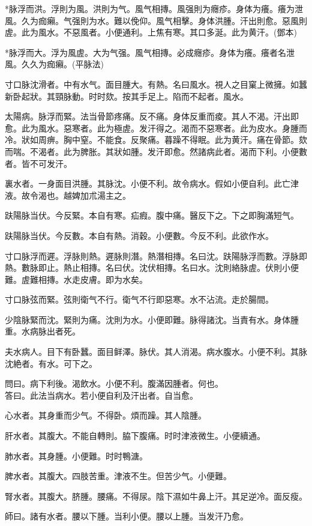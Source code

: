 \documentclass[b5paper,twoside,zihao=-4,UTF8]{ctexbook}
\begin{document}
*脉浮而洪。浮則为風。洪則为气。風气相摶。風强則为癮疹。身体为癢。癢为泄風。久为痂癩。气强則为水。難以俛仰。風气相擊。身体洪腫。汗出則愈。惡風則虗。此为風水。不惡風者。小便通利。上焦有寒。其口多涎。此为黄汗。(鄧本)

*脉浮而大。浮为風虗。大为气强。風气相摶。必成癮疹。身体为癢。癢者名泄風。久久为痂癩。(平脉法)

寸口脉沈滑者。中有水气。面目腫大。有熱。名曰風水。視人之目窠上微擁。如{蠶}新卧起狀。其頸脉動。时时欬。按其手足上。陷而不起者。風水。

太陽病。脉浮而緊。法当骨節疼痛。反不痛。身体反重而痠。其人不渴。汗出即愈。此为風水。惡寒者。此为極虗。发汗得之。渴而不惡寒者。此为皮水。身腫而冷。狀如周痹。胸中窒。不能食。反聚痛。暮躁不得眠。此为黄汗。痛在骨節。欬而喘。不渴者。此为脾胀。其狀如腫。发汗即愈。然諸病此者。渴而下利。小便數者。皆不可发汗。

裏水者。一身面目洪腫。其脉沈。小便不利。故令病水。假如小便自利。此亡津液。故令渴也。越婢加朮湯主之。

趺陽脉当伏。今反緊。本自有寒。疝瘕。腹中痛。醫反下之。下之即胸滿短气。

趺陽脉当伏。今反數。本自有熱。消穀。小便數。今反不利。此欲作水。

寸口脉浮而遲。浮脉則熱。遲脉則潛。熱潛相摶。名曰沈。趺陽脉浮而數。浮脉即熱。數脉即止。熱止相摶。名曰伏。沈伏相摶。名曰水。沈則絡脉虗。伏則小便難。虗難相摶。水走皮膚。即为水矣。

寸口脉弦而緊。弦則衛气不行。{衛气不行}即惡寒。水不沾流。走於腸間。

少陰脉緊而沈。緊則为痛。沈則为水。小便即難。脉得諸沈。当責有水。身体腫重。水病脉出者死。

夫水病人。目下有卧蠶。面目鲜澤。脉伏。其人消渴。病水腹水。小便不利。其脉沈絶者。有水。可下之。

問曰。病下利後。渴飲水。小便不利。腹滿因腫者。何也。\\
答曰。此法当病水。若小便自利及汗出者。自当愈。

心水者。其身重而少气。不得卧。煩而躁。其人陰腫。

肝水者。其腹大。不能自轉則。脇下腹痛。时时津液微生。小便續通。

肺水者。其身腫。小便難。时时鴨溏。

脾水者。其腹大。四肢苦重。津液不生。但苦少气。小便難。

腎水者。其腹大。脐腫。腰痛。不得尿。陰下濕如牛鼻上汗。其足逆冷。面反瘦。

師曰。諸有水者。腰以下腫。当利小便。腰以上腫。当发汗乃愈。
\end{document}
